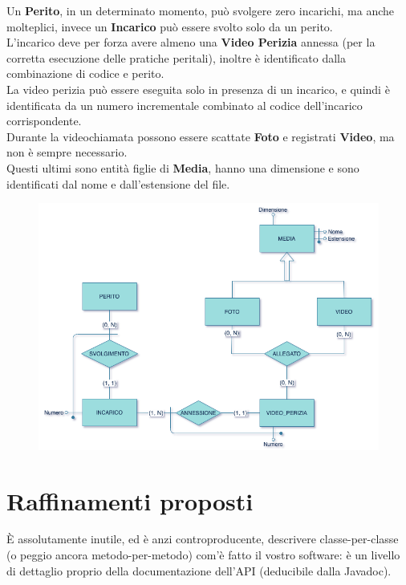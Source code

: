 \documentclass[a4paper,12pt]{report}
\begin{document}
Un \textbf{Perito}, in un determinato momento, può svolgere zero incarichi, ma anche molteplici, invece un \textbf{Incarico} può essere svolto solo da un perito.
\\
L’incarico deve per forza avere almeno una \textbf{Video Perizia} annessa (per la corretta esecuzione delle pratiche peritali), inoltre è identificato dalla combinazione di codice e perito.
\\
La video perizia può essere eseguita solo in presenza di un incarico, e quindi è identificata da un numero incrementale combinato al codice dell’incarico corrispondente.
\\
Durante la videochiamata possono essere scattate \textbf{Foto} e registrati \textbf{Video}, ma non è sempre necessario.
\\
Questi ultimi sono entità figlie di \textbf{Media}, hanno una dimensione e sono identificati dal nome e dall’estensione del file.
\\
\begin{figure}[ht]
    \begin{center}
        \centering
        \includegraphics[width=\textwidth]{img/VideoPerizia.png}
    \end{center}
\end{figure}
\clearpage

\section{Raffinamenti proposti}

È assolutamente inutile, ed è anzi controproducente, descrivere classe-per-classe (o peggio ancora metodo-per-metodo) com'è fatto il vostro software: è un livello di dettaglio proprio della documentazione dell'API (deducibile dalla Javadoc).
\end{document}
